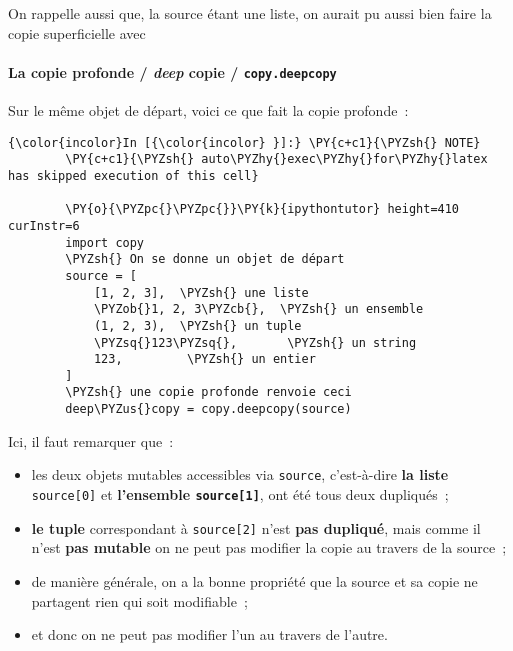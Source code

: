     On rappelle aussi que, la source étant une liste, on aurait pu aussi
bien faire la copie superficielle avec

\begin{Shaded}
\begin{Highlighting}[]
\OperatorTok{=}
\end{Highlighting}
\end{Shaded}

    \hypertarget{la-copie-profonde-deep-copie-copy.deepcopy}{%
\paragraph{\texorpdfstring{La copie profonde / \emph{deep} copie /
\texttt{copy.deepcopy}}{La copie profonde / deep copie / copy.deepcopy}}\label{la-copie-profonde-deep-copie-copy.deepcopy}}

    Sur le même objet de départ, voici ce que fait la copie profonde~:

    \begin{Verbatim}[commandchars=\\\{\}]
{\color{incolor}In [{\color{incolor} }]:} \PY{c+c1}{\PYZsh{} NOTE}
        \PY{c+c1}{\PYZsh{} auto\PYZhy{}exec\PYZhy{}for\PYZhy{}latex has skipped execution of this cell}
        
        \PY{o}{\PYZpc{}\PYZpc{}}\PY{k}{ipythontutor} height=410 curInstr=6
        import copy
        \PYZsh{} On se donne un objet de départ
        source = [
            [1, 2, 3],  \PYZsh{} une liste
            \PYZob{}1, 2, 3\PYZcb{},  \PYZsh{} un ensemble
            (1, 2, 3),  \PYZsh{} un tuple
            \PYZsq{}123\PYZsq{},       \PYZsh{} un string
            123,         \PYZsh{} un entier
        ]
        \PYZsh{} une copie profonde renvoie ceci
        deep\PYZus{}copy = copy.deepcopy(source)
\end{Verbatim}


    Ici, il faut remarquer que~:

\begin{itemize}
\tightlist
\item
  les deux objets mutables accessibles via \texttt{source}, c'est-à-dire
  \textbf{la liste} \texttt{source{[}0{]}} et \textbf{l'ensemble
  \texttt{source{[}1{]}}}, ont été tous deux dupliqués~;
\item
  \textbf{le tuple} correspondant à \texttt{source{[}2{]}} n'est
  \textbf{pas dupliqué}, mais comme il n'est \textbf{pas mutable} on ne
  peut pas modifier la copie au travers de la source~;
\item
  de manière générale, on a la bonne propriété que la source et sa copie
  ne partagent rien qui soit modifiable~;
\item
  et donc on ne peut pas modifier l'un au travers de l'autre.
\end{itemize}

